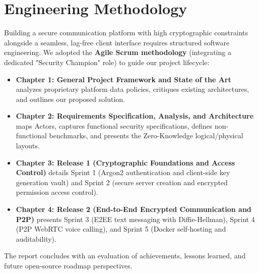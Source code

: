 \section*{Engineering Methodology}
Building a secure communication platform with high cryptographic constraints alongside a seamless, lag-free client interface requires structured software engineering. We adopted the \textbf{Agile Scrum methodology} (integrating a dedicated "Security Champion" role) to guide our project lifecycle:
\begin{itemize}
    \item \textbf{Chapter 1: General Project Framework and State of the Art} analyzes proprietary platform data policies, critiques existing architectures, and outlines our proposed solution.
    \item \textbf{Chapter 2: Requirements Specification, Analysis, and Architecture} maps Actors, captures functional security specifications, defines non-functional benchmarks, and presents the Zero-Knowledge logical/physical layouts.
    \item \textbf{Chapter 3: Release 1 (Cryptographic Foundations and Access Control)} details Sprint 1 (Argon2 authentication and client-side key generation vault) and Sprint 2 (secure server creation and encrypted permission access control).
    \item \textbf{Chapter 4: Release 2 (End-to-End Encrypted Communication and P2P)} presents Sprint 3 (E2EE text messaging with Diffie-Hellman), Sprint 4 (P2P WebRTC voice calling), and Sprint 5 (Docker self-hosting and auditability).
\end{itemize}
The report concludes with an evaluation of achievements, lessons learned, and future open-source roadmap perspectives.